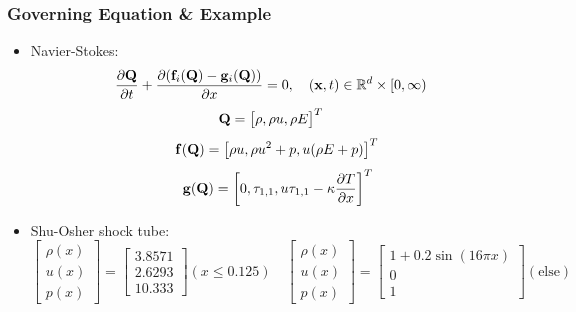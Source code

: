 \begin{frame}\frametitle{Governing Equation \& Example}
	\begin{itemize}
		\item Navier-Stokes: 
		\begin{equation*}
			\frac{\partial{\bf{Q}}}{\partial{t}}+\frac{\partial({{\bf f}_i({\bf Q})}-{\bf g}_i({\bf Q}))}{\partial{x}} = 0,\quad(\textbf{x},t)\in \mathbb{R}^d \times [0,\infty)
		\end{equation*}
		\begin{equation*}
			{\bf Q} = \big[\rho, \rho u, \rho E\big]^T
		\end{equation*}
		\begin{equation*}
			\quad {\bf f}({\bf Q}) = \big[\rho u, \rho u^2+p, u(\rho{E}+p)\big]^T
		\end{equation*}
		\begin{equation*}
			\quad {\bf g}({\bf Q}) = \bigg[0, \tau_{1,1}, u\tau_{1,1}-\kappa\frac{\partial{T}}{\partial{x}}\bigg]^T 
                      \end{equation*}
                    \item 
		Shu-Osher shock tube: {\begin{equation*}
			\begin{bmatrix}
				\rho(x) \\
				u(x) \\
				p(x)
			\end{bmatrix} = 
		\begin{bmatrix}
			3.8571 \\
			2.6293 \\
			10.333
		\end{bmatrix} (x\leq0.125)\quad
	\begin{bmatrix}
		\rho(x) \\
		u(x) \\
		p(x)
	\end{bmatrix} = 
	\begin{bmatrix}
		1+0.2\sin(16\pi x) \\
		0 \\
		1
	\end{bmatrix} (\text{else})
		\end{equation*}}
	\end{itemize}
\end{frame}

